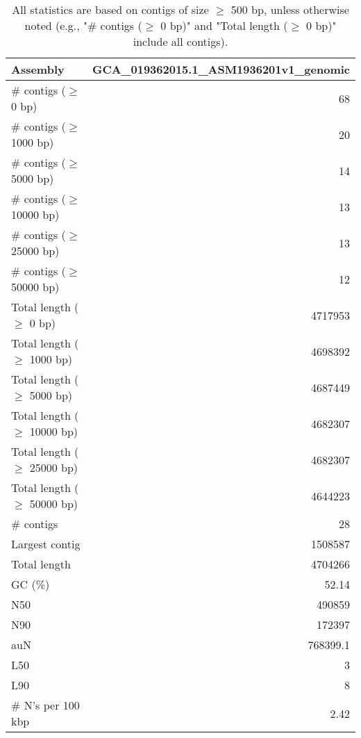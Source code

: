 \documentclass[12pt,a4paper]{article}
\begin{document}
\begin{table}[ht]
\begin{center}
\caption{All statistics are based on contigs of size $\geq$ 500 bp, unless otherwise noted (e.g., "\# contigs ($\geq$ 0 bp)" and "Total length ($\geq$ 0 bp)" include all contigs).}
\begin{tabular}{|l*{1}{|r}|}
\hline
Assembly & GCA\_019362015.1\_ASM1936201v1\_genomic \\ \hline
\# contigs ($\geq$ 0 bp) & 68 \\ \hline
\# contigs ($\geq$ 1000 bp) & 20 \\ \hline
\# contigs ($\geq$ 5000 bp) & 14 \\ \hline
\# contigs ($\geq$ 10000 bp) & 13 \\ \hline
\# contigs ($\geq$ 25000 bp) & 13 \\ \hline
\# contigs ($\geq$ 50000 bp) & 12 \\ \hline
Total length ($\geq$ 0 bp) & 4717953 \\ \hline
Total length ($\geq$ 1000 bp) & 4698392 \\ \hline
Total length ($\geq$ 5000 bp) & 4687449 \\ \hline
Total length ($\geq$ 10000 bp) & 4682307 \\ \hline
Total length ($\geq$ 25000 bp) & 4682307 \\ \hline
Total length ($\geq$ 50000 bp) & 4644223 \\ \hline
\# contigs & 28 \\ \hline
Largest contig & 1508587 \\ \hline
Total length & 4704266 \\ \hline
GC (\%) & 52.14 \\ \hline
N50 & 490859 \\ \hline
N90 & 172397 \\ \hline
auN & 768399.1 \\ \hline
L50 & 3 \\ \hline
L90 & 8 \\ \hline
\# N's per 100 kbp & 2.42 \\ \hline
\end{tabular}
\end{center}
\end{table}
\end{document}
